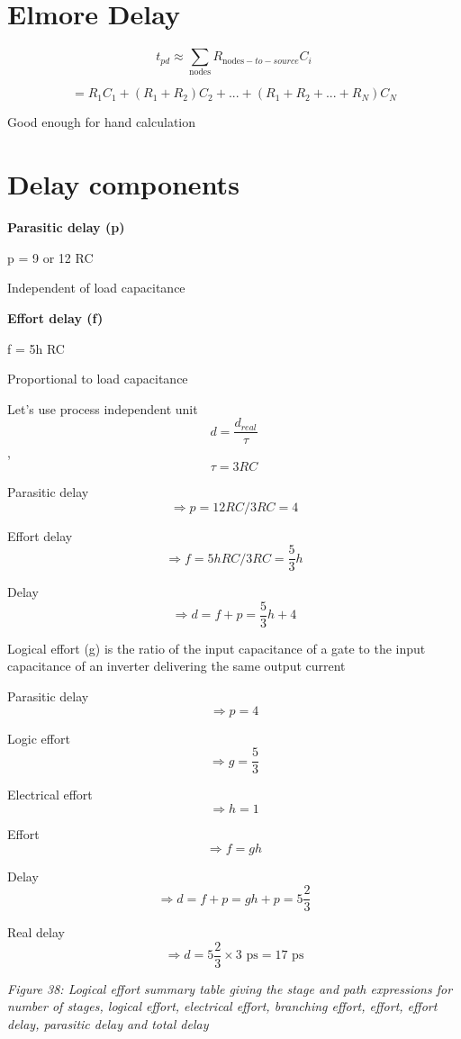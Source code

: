 \section{Elmore Delay}\label{elmore-delay}

\[ t_{pd} \approx \sum_{\text{nodes}}{R_{\text{nodes}-to-source} C_i} \]

\[ = R_1C_1 + (R_1 + R_2)C_2 + ... + (R_1 + R_2 + ... + R_N) C_N\]

Good enough for hand calculation

\section{Delay components}\label{delay-components}

\textbf{Parasitic delay (p)}

p = 9 or 12 RC

Independent of load capacitance

\textbf{Effort delay (f)}

f = 5h RC

Proportional to load capacitance

Let's use process independent unit \[d = \frac{d_{real}}{\tau}\],
\[ \tau = 3 RC\]

Parasitic delay \[\Rightarrow p = 12 RC / 3 RC = 4\]

Effort delay \[\Rightarrow f = 5h RC / 3RC = \frac{5}{3} h \]

Delay \[\Rightarrow d = f + p = \frac{5}{3}h + 4\]

Logical effort (g) is the ratio of the input capacitance of a gate to
the input capacitance of an inverter delivering the same output current

Parasitic delay \[\Rightarrow p = 4\]

Logic effort \[\Rightarrow g = \frac{5}{3} \]

Electrical effort \[\Rightarrow h = 1\]

Effort \[\Rightarrow f = gh \]

Delay \[\Rightarrow d = f + p = gh + p = 5\frac{2}{3}\]

Real delay
\[\Rightarrow d = 5\frac{2}{3} \times 3 \text{ ps} = 17 \text{ ps}\]


{
\centering
{}
}

\emph{Figure 38: Logical effort summary table giving the stage and path
expressions for number of stages, logical effort, electrical effort,
branching effort, effort, effort delay, parasitic delay and total delay}

